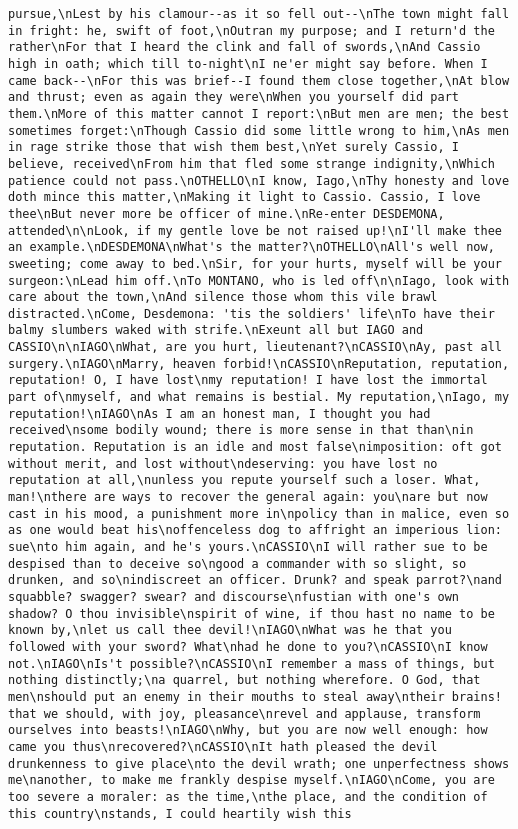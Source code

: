 \begin{verbatim}
pursue,\nLest by his clamour--as it so fell out--\nThe town might fall in fright: he, swift of foot,\nOutran my purpose; and I return'd the rather\nFor that I heard the clink and fall of swords,\nAnd Cassio high in oath; which till to-night\nI ne'er might say before. When I came back--\nFor this was brief--I found them close together,\nAt blow and thrust; even as again they were\nWhen you yourself did part them.\nMore of this matter cannot I report:\nBut men are men; the best sometimes forget:\nThough Cassio did some little wrong to him,\nAs men in rage strike those that wish them best,\nYet surely Cassio, I believe, received\nFrom him that fled some strange indignity,\nWhich patience could not pass.\nOTHELLO\nI know, Iago,\nThy honesty and love doth mince this matter,\nMaking it light to Cassio. Cassio, I love thee\nBut never more be officer of mine.\nRe-enter DESDEMONA, attended\n\nLook, if my gentle love be not raised up!\nI'll make thee an example.\nDESDEMONA\nWhat's the matter?\nOTHELLO\nAll's well now, sweeting; come away to bed.\nSir, for your hurts, myself will be your surgeon:\nLead him off.\nTo MONTANO, who is led off\n\nIago, look with care about the town,\nAnd silence those whom this vile brawl distracted.\nCome, Desdemona: 'tis the soldiers' life\nTo have their balmy slumbers waked with strife.\nExeunt all but IAGO and CASSIO\n\nIAGO\nWhat, are you hurt, lieutenant?\nCASSIO\nAy, past all surgery.\nIAGO\nMarry, heaven forbid!\nCASSIO\nReputation, reputation, reputation! O, I have lost\nmy reputation! I have lost the immortal part of\nmyself, and what remains is bestial. My reputation,\nIago, my reputation!\nIAGO\nAs I am an honest man, I thought you had received\nsome bodily wound; there is more sense in that than\nin reputation. Reputation is an idle and most false\nimposition: oft got without merit, and lost without\ndeserving: you have lost no reputation at all,\nunless you repute yourself such a loser. What, man!\nthere are ways to recover the general again: you\nare but now cast in his mood, a punishment more in\npolicy than in malice, even so as one would beat his\noffenceless dog to affright an imperious lion: sue\nto him again, and he's yours.\nCASSIO\nI will rather sue to be despised than to deceive so\ngood a commander with so slight, so drunken, and so\nindiscreet an officer. Drunk? and speak parrot?\nand squabble? swagger? swear? and discourse\nfustian with one's own shadow? O thou invisible\nspirit of wine, if thou hast no name to be known by,\nlet us call thee devil!\nIAGO\nWhat was he that you followed with your sword? What\nhad he done to you?\nCASSIO\nI know not.\nIAGO\nIs't possible?\nCASSIO\nI remember a mass of things, but nothing distinctly;\na quarrel, but nothing wherefore. O God, that men\nshould put an enemy in their mouths to steal away\ntheir brains! that we should, with joy, pleasance\nrevel and applause, transform ourselves into beasts!\nIAGO\nWhy, but you are now well enough: how came you thus\nrecovered?\nCASSIO\nIt hath pleased the devil drunkenness to give place\nto the devil wrath; one unperfectness shows me\nanother, to make me frankly despise myself.\nIAGO\nCome, you are too severe a moraler: as the time,\nthe place, and the condition of this country\nstands, I could heartily wish this 
\end{verbatim}
